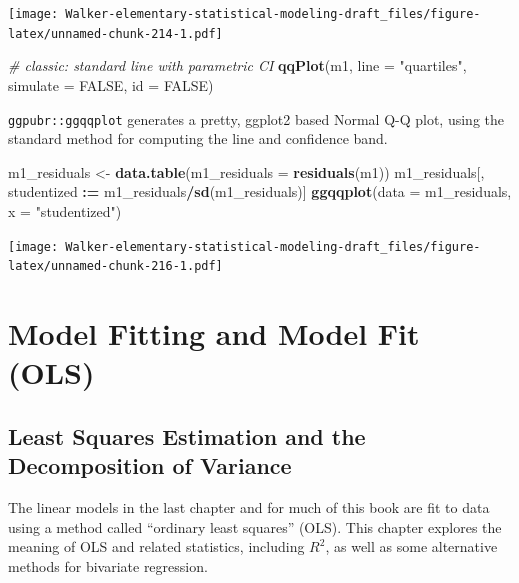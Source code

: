 \documentclass[]{book}
\newenvironment{Shaded}{\begin{snugshade}}{\end{snugshade}}
\newcommand{\CommentTok}[1]{\textcolor[rgb]{0.56,0.35,0.01}{\textit{#1}}}
\newcommand{\DataTypeTok}[1]{\textcolor[rgb]{0.13,0.29,0.53}{#1}}
\newcommand{\ErrorTok}[1]{\textcolor[rgb]{0.64,0.00,0.00}{\textbf{#1}}}
\newcommand{\KeywordTok}[1]{\textcolor[rgb]{0.13,0.29,0.53}{\textbf{#1}}}
\newcommand{\NormalTok}[1]{#1}
\newcommand{\OperatorTok}[1]{\textcolor[rgb]{0.81,0.36,0.00}{\textbf{#1}}}
\newcommand{\OtherTok}[1]{\textcolor[rgb]{0.56,0.35,0.01}{#1}}
\newcommand{\StringTok}[1]{\textcolor[rgb]{0.31,0.60,0.02}{#1}}
\begin{document}
\texttt{[image: Walker-elementary-statistical-modeling-draft\_files/figure-latex/unnamed-chunk-214-1.pdf]}

\begin{Shaded}
\begin{Highlighting}[]
\CommentTok{# classic: standard line with parametric CI}
\KeywordTok{qqPlot}\NormalTok{(m1,}
       \DataTypeTok{line =} \StringTok{"quartiles"}\NormalTok{,}
       \DataTypeTok{simulate =} \OtherTok{FALSE}\NormalTok{,}
       \DataTypeTok{id =} \OtherTok{FALSE}\NormalTok{)}
\end{Highlighting}
\end{Shaded}

\texttt{ggpubr::ggqqplot} generates a pretty, ggplot2 based Normal Q-Q plot, using the standard method for computing the line and confidence band.

\begin{Shaded}
\begin{Highlighting}[]
\NormalTok{m1_residuals <-}\StringTok{ }\KeywordTok{data.table}\NormalTok{(}\DataTypeTok{m1_residuals =} \KeywordTok{residuals}\NormalTok{(m1))}
\NormalTok{m1_residuals[, studentized }\OperatorTok{:}\ErrorTok{=}\StringTok{ }\NormalTok{m1_residuals}\OperatorTok{/}\KeywordTok{sd}\NormalTok{(m1_residuals)]}
\KeywordTok{ggqqplot}\NormalTok{(}\DataTypeTok{data =}\NormalTok{ m1_residuals,}
                          \DataTypeTok{x =} \StringTok{"studentized"}\NormalTok{)}
\end{Highlighting}
\end{Shaded}

\texttt{[image: Walker-elementary-statistical-modeling-draft\_files/figure-latex/unnamed-chunk-216-1.pdf]}

\hypertarget{model-fitting-and-model-fit-ols}{%
\chapter{Model Fitting and Model Fit (OLS)}\label{model-fitting-and-model-fit-ols}}

\hypertarget{least-squares-estimation-and-the-decomposition-of-variance}{%
\section{Least Squares Estimation and the Decomposition of Variance}\label{least-squares-estimation-and-the-decomposition-of-variance}}

The linear models in the last chapter and for much of this book are fit to data using a method called ``ordinary least squares'' (OLS). This chapter explores the meaning of OLS and related statistics, including \(R^2\), as well as some alternative methods for bivariate regression.
\end{document}
